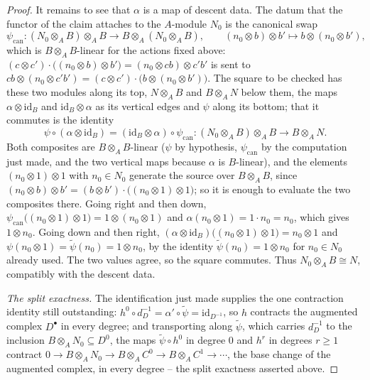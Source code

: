 \begin{proof}
It remains to see that $\alpha$ is a map of descent data.  The datum
that the functor of the claim attaches to the $A$-module $N_0$ is the
canonical swap
\[
\psi_{\mathrm{can}}:(N_0\otimes_AB)\otimes_AB\longrightarrow
B\otimes_A(N_0\otimes_AB),\qquad
(n_0\otimes b)\otimes b'\longmapsto b\otimes(n_0\otimes b'),
\]
which is $B\otimes_AB$-linear for the actions fixed above:
$(c\otimes c')\cdot\bigl((n_0\otimes b)\otimes b'\bigr)
=(n_0\otimes cb)\otimes c'b'$ is sent to
$cb\otimes(n_0\otimes c'b')
=(c\otimes c')\cdot\bigl(b\otimes(n_0\otimes b')\bigr)$.  The square to
be checked has these two modules along its top, $N\otimes_AB$ and
$B\otimes_AN$ below them, the maps $\alpha\otimes\mathrm{id}_B$ and
$\mathrm{id}_B\otimes\alpha$ as its vertical edges and $\psi$ along its
bottom; that it commutes is the identity
\[
\psi\circ(\alpha\otimes\mathrm{id}_B)
=(\mathrm{id}_B\otimes\alpha)\circ\psi_{\mathrm{can}}:
(N_0\otimes_AB)\otimes_AB\longrightarrow B\otimes_AN .
\]
Both composites are $B\otimes_AB$-linear ($\psi$ by hypothesis,
$\psi_{\mathrm{can}}$ by the computation just made, and the two
vertical maps because $\alpha$ is $B$-linear), and the elements
$(n_0\otimes1)\otimes1$ with $n_0\in N_0$ generate the source over
$B\otimes_AB$, since $(n_0\otimes b)\otimes b'=(b\otimes b')\cdot
\bigl((n_0\otimes1)\otimes1\bigr)$; so it is enough to evaluate the two
composites there.  Going right and then down,
$\psi_{\mathrm{can}}\bigl((n_0\otimes1)\otimes1\bigr)
=1\otimes(n_0\otimes1)$ and $\alpha(n_0\otimes1)=1\cdot n_0=n_0$, which
gives $1\otimes n_0$.  Going down and then right,
$(\alpha\otimes\mathrm{id}_B)\bigl((n_0\otimes1)\otimes1\bigr)
=n_0\otimes1$ and $\psi(n_0\otimes1)=\widetilde\psi(n_0)=1\otimes n_0$,
by the identity $\widetilde\psi(n_0)=1\otimes n_0$ for $n_0\in N_0$
already used.  The two values agree, so the square commutes.  Thus
$N_0\otimes_AB\cong N$, compatibly with the descent data.

\emph{The split exactness.}  The identification just made supplies the
one contraction identity still outstanding:
$h^0\circ d^{-1}_D=\alpha'\circ\widetilde\psi=\mathrm{id}_{D^{-1}}$, so
$h$ contracts the augmented complex $D^\bullet$ in every degree; and
transporting along $\widetilde\psi$, which carries $d^{-1}_D$ to the
inclusion $B\otimes_AN_0\subseteq D^0$, the maps $\widetilde\psi\circ
h^0$ in degree $0$ and $h^r$ in degrees $r\ge1$ contract
$0\to B\otimes_AN_0\to B\otimes_AC^0\to B\otimes_AC^1\to\cdots$, the
base change of the augmented complex, in every degree -- the split
exactness asserted above.


\end{proof}
